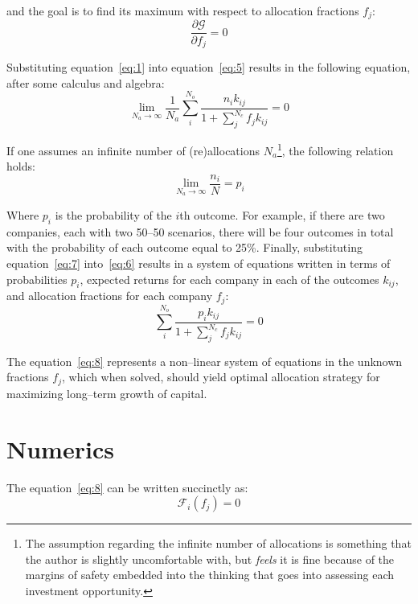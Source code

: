 \documentclass{article}
\begin{document}
\noindent and the goal is to find its maximum with respect to allocation
fractions $f_j$:
\begin{equation}
\label{eq:5}
    \frac{\partial \mathcal{G}}{\partial f_j} = 0
\end{equation}

\noindent Substituting equation~\eqref{eq:1} into equation~\eqref{eq:5} results
in the following equation, after some calculus and algebra:
\begin{equation}
\label{eq:6}
    \lim_{N_a \to \infty} \frac{1}{N_a}
    \sum_{i}^{N_o} \frac{n_i k_{ij}}{1 + \sum_{j}^{N_c} f_j k_{ij}} = 0
\end{equation}

\noindent If one assumes an infinite number of (re)allocations
$N_a$\footnote{The assumption regarding the infinite number of allocations is
something that the author is slightly uncomfortable with, but \textit{feels} it
is fine because of the margins of safety embedded into the thinking that goes
into assessing each investment opportunity.}, the following relation holds:
\begin{equation}
\label{eq:7}
    \lim_{N_a \to \infty} \frac{n_i}{N} = p_i
\end{equation}

\noindent Where $p_i$ is the probability of the $i$th outcome. For example, if
there are two companies, each with two 50--50 scenarios, there will be four
outcomes in total with the probability of each outcome equal to 25\%. Finally,
substituting equation~\eqref{eq:7} into~\eqref{eq:6} results in a system of
equations written in terms of probabilities $p_i$, expected returns for each
company in each of the outcomes $k_{ij}$, and allocation fractions for each
company $f_j$:
\begin{equation}
\label{eq:8}
    \sum_{i}^{N_o} \frac{p_i k_{ij}}{1 + \sum_{j}^{N_c} f_j k_{ij}} = 0
\end{equation}

\noindent The equation~\eqref{eq:8} represents a non--linear system of equations
in the unknown fractions $f_j$, which when solved, should yield optimal
allocation strategy for maximizing long--term growth of capital.

\section{Numerics}
\label{sec:numerics}

\noindent The equation~\eqref{eq:8} can be written succinctly as:
\begin{equation}
\label{eq:9}
    \mathcal{F}_i(f_j) = 0
\end{equation}
\end{document}
